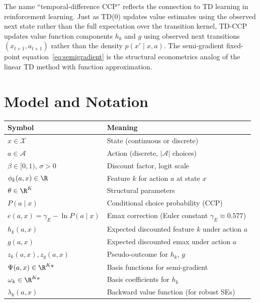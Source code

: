 \documentclass[10pt]{article}
\begin{document}
The name ``temporal-difference CCP'' reflects the connection to TD learning in reinforcement learning.
Just as TD($0$) updates value estimates using the observed next state rather than the full expectation over the transition kernel, TD-CCP updates value function components $h_k$ and $g$ using observed next transitions $(x_{t+1}, a_{t+1})$ rather than the density $p(x' \mid x,a)$.
The semi-gradient fixed-point equation~\eqref{eq:semigradient} is the structural econometrics analog of the \citet{tsitsiklisVanRoy1997} linear TD method with function approximation.

\section{Model and Notation}

\begin{table}[h!]
\centering\small
\begin{tabular}{ll}
\toprule
Symbol & Meaning \\
\midrule
$x \in \mathcal{X}$ & State (continuous or discrete) \\
$a \in \mathcal{A}$ & Action (discrete, $|\mathcal{A}|$ choices) \\
$\beta \in [0,1)$, $\sigma > 0$ & Discount factor, logit scale \\
$\phi_k(a,x) \in \R$ & Feature $k$ for action $a$ at state $x$ \\
$\theta \in \R^K$ & Structural parameters \\
\midrule
$P(a \mid x)$ & Conditional choice probability (CCP) \\
$e(a,x) = \gamma_E - \ln P(a \mid x)$ & Emax correction (Euler constant $\gamma_E \approx 0.577$) \\
$h_k(a,x)$ & Expected discounted feature $k$ under action $a$ \\
$g(a,x)$ & Expected discounted emax under action $a$ \\
$z_k(a,x), z_g(a,x)$ & Pseudo-outcome for $h_k$, $g$ \\
\midrule
$\Psi(a,x) \in \R^{K_\Psi}$ & Basis functions for semi-gradient \\
$\omega_k \in \R^{K_\Psi}$ & Basis coefficients for $h_k$ \\
$\lambda_k(a,x)$ & Backward value function (for robust SEs) \\
\bottomrule
\end{tabular}
\end{table}
\FloatBarrier
\end{document}
